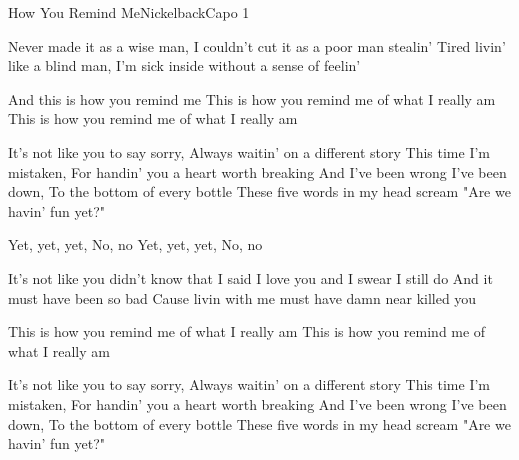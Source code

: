 \begin{song}{How You Remind Me}{Nickelback}{Capo 1}

Never made it as a wise man, I couldn't cut it as a poor man stealin'
 Tired livin' like a blind man, I'm sick inside without a sense of feelin'

And this is how you remind me
 This is how you remind me of what I really am
 This is how you remind me of what I really am

 It's not like you   to say sorry, Always waitin' on a different story
 This time I'm   mistaken, For handin' you a heart worth breaking
And I've been wrong   I've been down, To the bottom of every bottle
  These five words in my head  scream "Are we havin' fun yet?"

  Yet, yet, yet, No, no
  Yet, yet, yet, No, no

It's not like you didn't know that
 I said I love you and I swear I still do
 And it must have been so bad
 Cause livin with me must have damn near killed you

 This is how you remind me of what I really am
 This is how you remind me of what I really am

 It's not like you   to say sorry, Always waitin' on a different story
 This time I'm   mistaken, For handin' you a heart worth breaking
And I've been wrong   I've been down, To the bottom of every bottle
  These five words in my head  scream "Are we havin' fun yet?"


\end{song}
